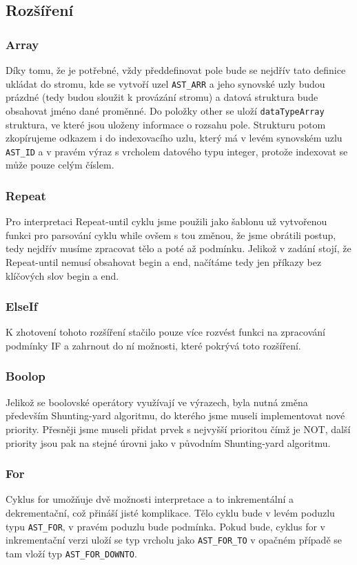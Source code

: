 \documentclass[12pt,a4paper,titlepage,final]{article}
\begin{document}
\subsection{Rozšíření}
\subsubsection{Array}
Díky tomu, že je potřebné, vždy předdefinovat pole bude se nejdřív tato definice ukládat do stromu, kde se vytvoří uzel \verb|AST_ARR| a jeho synovské uzly budou prázdné (tedy budou sloužit k provázání stromu) a datová struktura bude obsahovat jméno dané proměnné. Do položky other se uloží \verb|dataTypeArray| struktura, ve které jsou uloženy informace o rozsahu pole. Strukturu potom zkopírujeme odkazem i do indexovacího uzlu, který má v levém synovském uzlu \verb|AST_ID| a v pravém výraz s vrcholem datového typu integer, protože indexovat se může pouze celým číslem.
\subsubsection{Repeat}
Pro interpretaci Repeat-until cyklu jsme použili jako šablonu už vytvořenou funkci pro parsování cyklu while ovšem s tou změnou, že jsme obrátili postup, tedy nejdřív musíme zpracovat tělo a poté až podmínku. Jelikož v zadání stojí, že Repeat-until nemusí obsahovat begin a end, načítáme tedy jen příkazy bez klíčových slov begin a end.
\subsubsection{ElseIf}
K zhotovení tohoto rozšíření stačilo pouze více rozvést funkci na zpracování podmínky IF a zahrnout do ní možnosti, které pokrývá toto rozšíření.
\subsubsection{Boolop}
Jelikož se boolovské operátory využívají ve výrazech, byla nutná změna především Shunting-yard algoritmu, do kterého jsme museli implementovat nové priority. Přesněji jsme museli přidat prvek s nejvyšší prioritou čímž je NOT, další priority jsou pak na stejné úrovni jako v původním Shunting-yard algoritmu.
\subsubsection{For}
Cyklus for umožňuje dvě možnosti interpretace a to inkrementální a dekrementační, což přináší jisté komplikace. Tělo cyklu bude v levém poduzlu typu \verb|AST_FOR|, v pravém poduzlu bude podmínka. Pokud bude, cyklus for v inkrementační verzi uloží se typ vrcholu jako \verb|AST_FOR_TO| v opačném případě se tam vloží typ \verb|AST_FOR_DOWNTO|.
\end{document}
